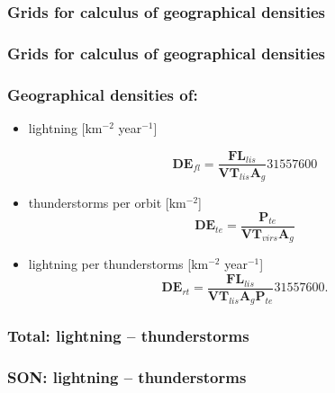 \documentclass[smaller]{beamer}
\begin{document}
\begin{frame}
\frametitle{Grids for calculus of geographical densities}

\end{frame}

\begin{frame}
\frametitle{Grids for calculus of geographical densities}

\end{frame}


\begin{frame}
\frametitle{Geographical densities of:}
\Large
\begin{itemize}
\item lightning [km$^{-2}$ year$^{-1}$]

\begin{equation}
\mathbf{DE}_{fl} = \frac{\mathbf{FL}_{lis}}{\mathbf{VT}_{lis} \mathbf{A}_g} 31557600     
\label{defl}
\end{equation}

\item thunderstorms per orbit [km$^{-2}$]
\begin{equation}
\mathbf{DE}_{te} = \frac{\mathbf{P}_{te}}{\mathbf{VT}_{virs} \mathbf{A}_g}    
\label{dete}
\end{equation}

\item lightning per thunderstorms [km$^{-2}$ year$^{-1}$]
\begin{equation}
\mathbf{DE}_{rt} = \frac{\mathbf{FL}_{lis}}{\mathbf{VT}_{lis} \mathbf{A}_g\mathbf{P}_{te}} 31557600.  
\label{dert}
\end{equation}
\end{itemize}

\end{frame}


\begin{frame}
\frametitle{Total: lightning -- thunderstorms}

\end{frame}


\begin{frame}
\frametitle{SON: lightning -- thunderstorms}

\end{frame}
\end{document}
